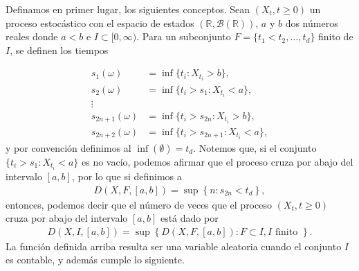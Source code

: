 Definamos en primer lugar, los siguientes conceptos. Sean $(X_t, t \geq 0)$ un proceso estocástico con el espacio de estados $(\mathbb{R}, \mathcal{B}(\mathbb{R}))$, $a$ y $b$ dos números reales donde $a < b$ e $I \subset [0, \infty)$. Para un subconjunto $F = \{t_1 < t_2, \ldots, t_d\}$ finito de $I$, se definen los tiempos

\begin{align*}
	s_1(\omega) & = \inf \{t_i : X_{t_i} > b\}, \\
    s_2(\omega) & = \inf \{t_i > s_1 : X_{t_i} < a\}, \\
    \vdots \\
    s_{2n + 1}(\omega) & = \inf \{ t_i > s_{2n} : X_{t_i} > b \}, \\
    s_{2n + 2}(\omega) & = \inf \{ t_i > s_{2n + 1} : X_{t_i} < a \},
\end{align*}
y por convención definimos al $\inf(\emptyset) = t_d$. Notemos que, si el conjunto $\{t_i > s_1 : X_{t_i} < a\}$ es no vacío, podemos afirmar que el proceso cruza por abajo del intervalo $[a, b]$, por lo que si definimos a
\begin{align*}
	D(X, F, [a, b]) = \sup \left\{ n : s_{2n} < t_d \right\},
\end{align*}
entonces, podemos decir que el número de veces que el proceso $(X_t, t \geq 0)$ cruza por abajo del intervalo $[a, b]$ está dado por
\begin{align}
	D(X, I, [a, b]) = \sup \left\{ D(X, F, [a, b]) : F \subset I, I \text{ finito } \right\}.
\end{align}
La función definida arriba resulta ser una variable aleatoria cuando el conjunto $I$ es contable, y además cumple lo siguiente.

